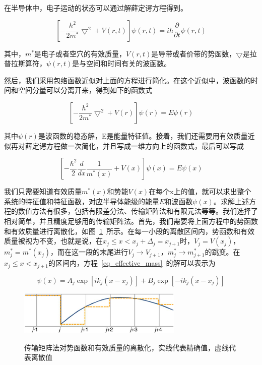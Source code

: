 \documentclass{ZJUthesis}
\begin{document}
在半导体中，电子运动的状态可以通过解薛定谔方程得到。

\begin{equation}
    \label{schrodinger}
    \left[ -\frac{h^2}{ 2m^*} \bigtriangledown ^2 + V(r,t) \right] \psi(r,t) = ih \frac{\partial}{\partial t}  \psi(r,t) 
\end{equation}

其中，$m^*$是电子或者空穴的有效质量，$V(r,t)$是导带或者价带的势函数，$\bigtriangledown$是拉普拉斯算符，$\psi(r,t)$是与空间和时间有关的波函数。

然后，我们采用包络函数近似对上面的方程进行简化。在这个近似中，波函数的时间和空间分量可以分离开来，得到如下的函数式

\begin{equation}
    \label{schrodinger2}
    \left[ -\frac{h^2}{ 2m^*} \bigtriangledown ^2 + V(r) \right] \psi(r) = E  \psi(r) 
\end{equation}

其中$\psi(r)$是波函数的稳态解，E是能量特征值。接着，我们还需要用有效质量近似再对薛定谔方程做一次简化，并且写成一维方向上的函数式，最后可以写成

\begin{equation}
    \label{eq_effective_mass}
    \left[ -\frac{\hbar^2}{2} \frac{d}{dx} \frac{1}{m^*(x)} + V(x) \right] \psi(x) = E \psi(x)
\end{equation}

我们只需要知道有效质量$m^*(x)$和势能$V(x)$在每个x上的值，就可以求出整个系统的特征值和特征函数，对应半导体能级的能量$E$和波函数$\psi(x)$。求解上述方程的数值方法有很多，包括有限差分法、传输矩阵法和有限元法等等。我们选择了相对简单，并且精度足够用的传输矩阵法。首先，我们需要将上面方程中的势函数和有效质量进行离散化，如图~\ref{fig_tmm}~所示。在每一小段的离散区间内，势函数和有效质量被视为不变，也就是说，在$x_j\le x<x_j+\Delta_j=x_{j+1}$时，$V_j=V(x_j)$，$m^*_j=m^*(x_j)$，而在这一段的末尾进行$V_j\to V_{j+1}$，$m^*_j\to m^*_{j+1}$的跳变。在$x_j\le x<x_{j+1}$的区间内，方程~\ref{eq_effective_mass}~的解可以表示为

\begin{equation}
    \label{eq_effective_mass_solution}
    \psi(x) = A_j \exp [i k_j (x-x_j)] + B_j \exp [-i k_j (x-x_j)]
\end{equation}

\begin{figure}[htbp]
  \centering
  \includegraphics[width=0.7\textwidth]{./Pictures/tmm.eps}\\
  \caption{传输矩阵法对势函数和有效质量的离散化，实线代表精确值，虚线代表离散值\cite{Jirauschek2009Accuracy}}
  \label{fig_tmm}
\end{figure}
\end{document}
